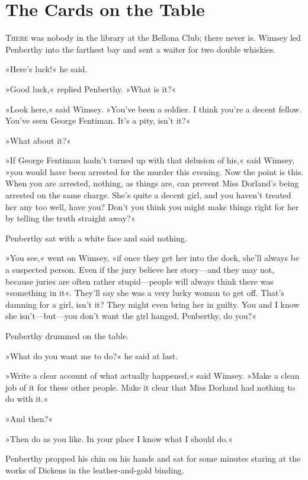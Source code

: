 \chapter{The Cards on the Table}

\lettrine[lines=4]{T}{here} was nobody in the library at the Bellona Club; there never is. Wimsey led Penberthy into the farthest bay and sent a waiter for two double whiskies.

\zz
»Here's luck!« he said.

»Good luck,« replied Penberthy. »What is it?«

»Look here,« said Wimsey. »You've been a soldier. I think you're a decent fellow. You've seen George Fentiman. It's a pity, isn't it?«

»What about it?«

»If George Fentiman hadn't turned up with that delusion of his,« said Wimsey, »you would have been arrested for the murder this evening. Now the point is this. When you are arrested, nothing, as things are, can prevent Miss Dorland's being arrested on the same charge. She's quite a decent girl, and you haven't treated her any too well, have you? Don't you think you might make things right for her by telling the truth straight away?«

Penberthy sat with a white face and said nothing.

»You see,« went on Wimsey, »if once they get her into the dock, she'll always be a suspected person. Even if the jury believe her story—and they may not, because juries are often rather stupid—people will always think there was »something in it«. They'll say she was a very lucky woman to get off. That's damning for a girl, isn't it? They might even bring her in guilty. You and I know she isn't—but—you don't want the girl hanged, Penberthy, do you?«

Penberthy drummed on the table.

»What do you want me to do?« he said at last.

»Write a clear account of what actually happened,« said Wimsey. »Make a clean job of it for these other people. Make it clear that Miss Dorland had nothing to do with it.«

»And then?«

»Then do as you like. In your place I know what I should do.«

Penberthy propped his chin on his hands and sat for some minutes staring at the works of Dickens in the leather-and-gold binding.

